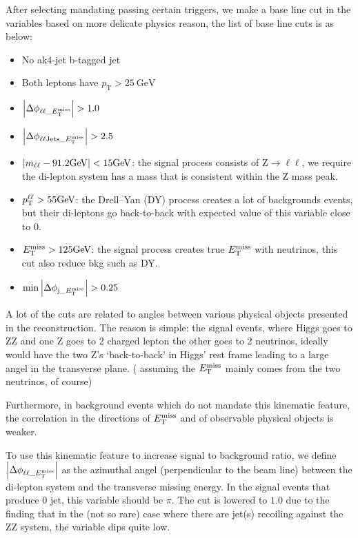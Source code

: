 After selecting mandating passing certain triggers, we make a base line cut in the variables
based on more delicate physics reason, the list of base line cuts is as below:
\begin{itemize}
    \item No ak4-jet b-tagged jet
    \item Both leptons have $p_\mathrm{T} > \SI{25}{\giga\electronvolt}$
    \item $\abs{\Delta\phi_{\ell\ell\_E_{\mathrm{T}}^{\mathrm{miss}}}} > 1.0$
    \item $\abs{\Delta\phi_{\ell\ell\mathrm{Jets}\_E_{\mathrm{T}}^{\mathrm{miss}}}} > 2.5$
    \item $\abs{m_{\ell\ell} - 91.2\si{\giga\electronvolt}} < 15\si{\giga\electronvolt}$:
        the signal process consists of $\mathrm{Z}\rightarrow{}\ell\ell$, we
        require the di-lepton system has a mass that is consistent within the Z mass peak.
    \item $p_\mathrm{T}^{\ell\ell} > 55\si{\giga\electronvolt}$: 
        the Drell–Yan (DY) process creates a lot of backgrounds events, but their di-leptons
        go back-to-back with expected value of this variable close to 0.
    \item $E_{\mathrm{T}}^{\mathrm{miss}} > 125\si{\giga\electronvolt}$:
        the signal process creates true $E_{\mathrm{T}}^{\mathrm{miss}}$ with neutrinos, this cut also reduce bkg such
        as DY.
    \item $\min{\abs{ \Delta\phi_{\mathrm{j}\_E_{\mathrm{T}}^{\mathrm{miss}}}}} > 0.25$
\end{itemize}

A lot of the cuts are related to angles between various physical objects presented in the
reconstruction. The reason is simple: the signal events, where Higgs goes to ZZ and one Z
goes to 2 charged lepton the other goes to 2 neutrinos, ideally would have the two Z's 
`back-to-back' in Higgs' rest frame leading to a large angel in the transverse plane. (
assuming the $E_{\mathrm{T}}^{\mathrm{miss}}$ mainly comes from the two neutrinos, of course)

Furthermore, in background events which do not mandate this kinematic feature, the
correlation in the directions of $E_{\mathrm{T}}^{\mathrm{miss}}$ and of observable physical objects is weaker.

To use this kinematic feature to increase signal to background ratio, we define 
$\abs{\Delta\phi_{\ell\ell\_E_{\mathrm{T}}^{\mathrm{miss}}}}$ as the azimuthal angel (perpendicular to 
the beam line) between the di-lepton system and the transverse missing energy. In the
signal events that produce 0 jet, this variable should be $\pi$. The cut is lowered to $1.0$ 
due to the finding that in the (not so rare) case where there are jet(s) recoiling against
the ZZ system, the variable dips quite low.

